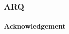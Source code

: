 \begin{frame}		
	
	\frametitle{ARQ}
	\framesubtitle{Acknowledgement}
	
	\begin{figure}[H]
	\end{figure}
	
	
\end{frame}

